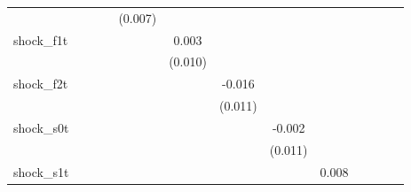 {\begin{tabular}{l*{12}{c}}
            &                     &                     &                     &     (0.007)         &                     &                     &                     &                     &                     &                     &                     &                     \\
\addlinespace
shock\_f1t   &                     &                     &                     &                     &       0.003         &                     &                     &                     &                     &                     &                     &                     \\
            &                     &                     &                     &                     &     (0.010)         &                     &                     &                     &                     &                     &                     &                     \\
\addlinespace
shock\_f2t   &                     &                     &                     &                     &                     &      -0.016         &                     &                     &                     &                     &                     &                     \\
            &                     &                     &                     &                     &                     &     (0.011)         &                     &                     &                     &                     &                     &                     \\
\addlinespace
shock\_s0t   &                     &                     &                     &                     &                     &                     &      -0.002         &                     &                     &                     &                     &                     \\
            &                     &                     &                     &                     &                     &                     &     (0.011)         &                     &                     &                     &                     &                     \\
\addlinespace
shock\_s1t   &                     &                     &                     &                     &                     &                     &                     &       0.008         &                     &                     &                     &                     \\

\end{tabular}}
